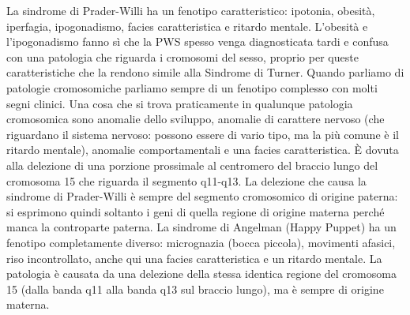 \documentclass[11pt]{book}
\begin{document}
La sindrome di Prader-Willi ha un fenotipo caratteristico: ipotonia, obesità, iperfagia, ipogonadismo, facies caratteristica e ritardo mentale. L’obesità e l’ipogonadismo fanno sì che la PWS spesso venga diagnosticata tardi e confusa con una patologia che riguarda i cromosomi del sesso, proprio per queste caratteristiche che la rendono simile alla Sindrome di Turner.
Quando parliamo di patologie cromosomiche parliamo sempre di un fenotipo complesso con molti segni clinici. Una cosa che si trova praticamente in qualunque patologia cromosomica sono anomalie dello sviluppo, anomalie di carattere nervoso (che riguardano il sistema nervoso: possono essere di vario tipo, ma la più comune è il ritardo mentale), anomalie comportamentali e una facies caratteristica.
È dovuta alla delezione di una porzione prossimale al centromero del braccio lungo del cromosoma 15 che riguarda il segmento q11-q13. La delezione che causa la sindrome di Prader-Willi è sempre del segmento cromosomico di origine paterna: si esprimono quindi soltanto i geni di quella regione di origine materna perché manca la controparte paterna. 
La sindrome di Angelman (Happy Puppet) ha un fenotipo completamente diverso: micrognazia (bocca piccola), movimenti afasici, riso incontrollato, anche qui una facies caratteristica e un ritardo mentale. La patologia è causata da una delezione della stessa identica regione del cromosoma 15 (dalla banda q11 alla banda q13 sul braccio lungo), ma è sempre di origine materna.
\end{document}
